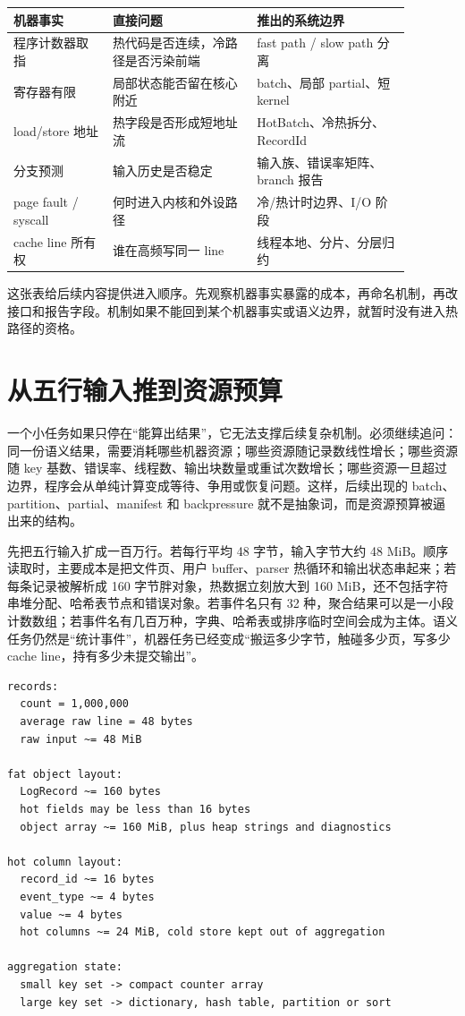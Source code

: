 \begin{center}
\begin{tabular}{p{0.22\linewidth}p{0.32\linewidth}p{0.34\linewidth}}
\toprule
机器事实 & 直接问题 & 推出的系统边界 \\
\midrule
程序计数器取指 & 热代码是否连续，冷路径是否污染前端 & fast path / slow path 分离 \\
寄存器有限 & 局部状态能否留在核心附近 & batch、局部 partial、短 kernel \\
load/store 地址 & 热字段是否形成短地址流 & HotBatch、冷热拆分、RecordId \\
分支预测 & 输入历史是否稳定 & 输入族、错误率矩阵、branch 报告 \\
page fault / syscall & 何时进入内核和外设路径 & 冷/热计时边界、I/O 阶段 \\
cache line 所有权 & 谁在高频写同一 line & 线程本地、分片、分层归约 \\
\bottomrule
\end{tabular}
\end{center}

这张表给后续内容提供进入顺序。先观察机器事实暴露的成本，再命名机制，再改接口和报告字段。机制如果不能回到某个机器事实或语义边界，就暂时没有进入热路径的资格。

\section{从五行输入推到资源预算}

一个小任务如果只停在“能算出结果”，它无法支撑后续复杂机制。必须继续追问：同一份语义结果，需要消耗哪些机器资源；哪些资源随记录数线性增长；哪些资源随 key 基数、错误率、线程数、输出块数量或重试次数增长；哪些资源一旦超过边界，程序会从单纯计算变成等待、争用或恢复问题。这样，后续出现的 batch、partition、partial、manifest 和 backpressure 就不是抽象词，而是资源预算被逼出来的结构。

先把五行输入扩成一百万行。若每行平均 48 字节，输入字节大约 48 MiB。顺序读取时，主要成本是把文件页、用户 buffer、parser 热循环和输出状态串起来；若每条记录被解析成 160 字节胖对象，热数据立刻放大到 160 MiB，还不包括字符串堆分配、哈希表节点和错误对象。若事件名只有 32 种，聚合结果可以是一小段计数数组；若事件名有几百万种，字典、哈希表或排序临时空间会成为主体。语义任务仍然是“统计事件”，机器任务已经变成“搬运多少字节，触碰多少页，写多少 cache line，持有多少未提交输出”。

\begin{lstlisting}[numbers=none,caption={从语义量到机器预算的粗账本}]
records:
  count = 1,000,000
  average raw line = 48 bytes
  raw input ~= 48 MiB

fat object layout:
  LogRecord ~= 160 bytes
  hot fields may be less than 16 bytes
  object array ~= 160 MiB, plus heap strings and diagnostics

hot column layout:
  record_id ~= 16 bytes
  event_type ~= 4 bytes
  value ~= 4 bytes
  hot columns ~= 24 MiB, cold store kept out of aggregation

aggregation state:
  small key set -> compact counter array
  large key set -> dictionary, hash table, partition or sort
\end{lstlisting}

